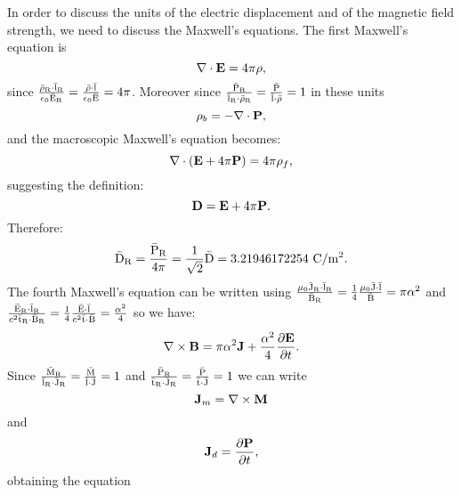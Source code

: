 \documentclass[12pt,a4paper,twoside]{report}
\def\bardry{3.21946172254}
\begin{document}
{{In order to discuss the units of the electric displacement and of
the magnetic field strength, we need to discuss the Maxwell's equations.
The first Maxwell's equation is
\begin{equation}
\nabla\cdot {\bf E} = 4 \pi \rho,
\end{equation}
since ${{\rm \bar \rho_R}\cdot {\rm \bar l_R} \over \epsilon_0 {\rm \bar E_R}}=
{{\rm \bar \rho}\cdot {\rm \bar l} \over \epsilon_0 {\rm \bar E}}=4\pi$. Moreover since
${{\rm \bar P_R} \over {\rm \bar l_R}\cdot {\rm \bar \rho_R}}={{\rm \bar P} \over {\rm \bar l}\cdot {\rm \bar \rho}}=1$
in these units 
\begin{equation}
\rho_b=-\nabla \cdot {\bf P},
\end{equation} 
and the macroscopic Maxwell's equation becomes:
\begin{equation}
\nabla\cdot ({\bf E}+4\pi {\bf P}) = 4 \pi \rho_f,
\end{equation}
suggesting the definition:
\begin{equation}
{\bf D}={\bf E}+4\pi {\bf P}.
\end{equation}
Therefore:
\begin{equation}
{\rm \bar D_R}={{\rm \bar P_R} \over 4 \pi} = {1\over \sqrt{2}} {\rm \bar D}=\bardry\ {\rm C}/{\rm m}^2.
\end{equation}
The fourth Maxwell's equation can be written using
${\mu_0 {\rm \bar J_R}\cdot {\rm \bar l_R} \over {\rm \bar B_R}}={1\over 4} 
{\mu_0 {\rm \bar J}\cdot {\rm \bar l} \over {\rm \bar B}}= \pi \alpha^2$ and
${{\rm \bar E_R}\cdot {\rm \bar l_R} \over c^2 {\rm \bar t_R}\cdot {\rm \bar B_R}}={1\over 4}
{{\rm \bar E}\cdot {\rm \bar l} \over c^2 {\rm \bar t}\cdot {\rm \bar B}}={\alpha^2 \over 4}$ so we have:
\begin{equation}
\nabla \times {\bf B}= \pi \alpha^2 {\bf J} + {\alpha^2 \over 4}
{\partial {\bf E} \over \partial t}.
\end{equation}
Since ${{\rm \bar M_R} \over {\rm \bar l_R}\cdot {\rm \bar J_R}}={{\rm \bar M} \over {\rm \bar l}\cdot {\rm \bar J}}=1$
and ${{\rm \bar P_R} \over {\rm \bar t_R}\cdot {\rm \bar J_R}}={{\rm \bar P} \over {\rm \bar t}\cdot {\rm \bar J}}=1$
we can write
\begin{equation}
{\bf J}_m=\nabla \times {\bf M}
\end{equation}
and
\begin{equation}
{\bf J}_d={\partial {\bf P} \over \partial t},
\end{equation}
obtaining the equation
\begin{equation}

\end{equation}}}
\end{document}
